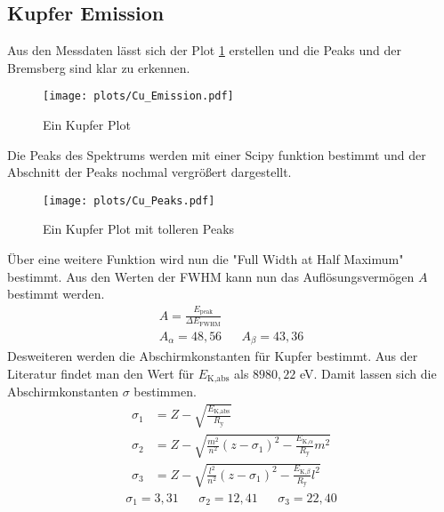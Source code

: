 \subsection{Kupfer Emission}
Aus den Messdaten lässt sich der Plot \ref{fig:Cu_Emission} erstellen und die Peaks und der Bremsberg sind klar zu erkennen.
\begin{figure}
    \centering
    \texttt{[image: plots/Cu\_Emission.pdf]}
    \caption{Ein Kupfer Plot}
    \label{fig:Cu_Emission}
\end{figure}
Die Peaks des Spektrums werden mit einer Scipy funktion bestimmt und der Abschnitt der Peaks nochmal vergrößert dargestellt.
\begin{figure}
    \centering
    \texttt{[image: plots/Cu\_Peaks.pdf]}
    \caption{Ein Kupfer Plot mit tolleren Peaks}
    \label{fig:Cu_Peaks}
\end{figure}
Über eine weitere Funktion wird nun die "Full Width at Half Maximum" bestimmt.
Aus den Werten der FWHM kann nun das Auflösungsvermögen $A$ bestimmt werden.
\begin{align}
    A = \frac{E_{\text{peak}}}{\Delta E_{\text{FWHM}}} \nonumber\\
    A_{\alpha}= 48,56 && A_{\beta} = 43,36
\end{align}
Desweiteren werden die Abschirmkonstanten für Kupfer bestimmt.
Aus der Literatur findet man den Wert für $E_{\text{K,abs}}$ als $8980,22$ eV.
Damit lassen sich die Abschirmkonstanten $\sigma$ bestimmen.
\begin{align*}
    \sigma_1 &= Z-\sqrt{\frac{E_{\text{K,abs}}}{R_{\text{y}}}} \\
    \sigma_2 &= Z-\sqrt{ \frac{m^2}{n^2}\left(z-\sigma_1\right)^2- \frac{E_{\text{K,}\alpha}}{R_{\text{y}}}m^2 } \\
    \sigma_3 &= Z-\sqrt{ \frac{l^2}{n^2}\left(z-\sigma_1\right)^2- \frac{E_{\text{K,}\beta}}{R_{\text{y}}}l^2 }
\end{align*}
\begin{align}
    \sigma_1 = 3,31 && \sigma_2 = 12,41 && \sigma_3 = 22,40 
\end{align}

